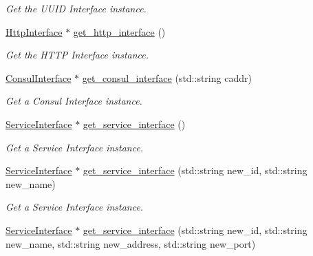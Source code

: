 \begin{DoxyCompactItemize}
\begin{DoxyCompactList}\small\item\em Get the U\-U\-I\-D Interface instance. \end{DoxyCompactList}\item 
\hypertarget{classServiceComponentFactory_a231204b51354b045ea3d5fff7b07ec94}{\hyperlink{classHttpInterface}{Http\-Interface} $\ast$ \hyperlink{classServiceComponentFactory_a231204b51354b045ea3d5fff7b07ec94}{get\-\_\-http\-\_\-interface} ()}\label{classServiceComponentFactory_a231204b51354b045ea3d5fff7b07ec94}

\begin{DoxyCompactList}\small\item\em Get the H\-T\-T\-P Interface instance. \end{DoxyCompactList}\item 
\hypertarget{classServiceComponentFactory_a8f1a67c4158e2e9fc844563b7c35dc15}{\hyperlink{classConsulInterface}{Consul\-Interface} $\ast$ \hyperlink{classServiceComponentFactory_a8f1a67c4158e2e9fc844563b7c35dc15}{get\-\_\-consul\-\_\-interface} (std\-::string caddr)}\label{classServiceComponentFactory_a8f1a67c4158e2e9fc844563b7c35dc15}

\begin{DoxyCompactList}\small\item\em Get a Consul Interface instance. \end{DoxyCompactList}\item 
\hypertarget{classServiceComponentFactory_a18fc7b189a89281312ae594db57bf9f3}{\hyperlink{classServiceInterface}{Service\-Interface} $\ast$ \hyperlink{classServiceComponentFactory_a18fc7b189a89281312ae594db57bf9f3}{get\-\_\-service\-\_\-interface} ()}\label{classServiceComponentFactory_a18fc7b189a89281312ae594db57bf9f3}

\begin{DoxyCompactList}\small\item\em Get a Service Interface instance. \end{DoxyCompactList}\item 
\hypertarget{classServiceComponentFactory_ae0f4ffe321b3ef4f0677a319a29bb7ac}{\hyperlink{classServiceInterface}{Service\-Interface} $\ast$ \hyperlink{classServiceComponentFactory_ae0f4ffe321b3ef4f0677a319a29bb7ac}{get\-\_\-service\-\_\-interface} (std\-::string new\-\_\-id, std\-::string new\-\_\-name)}\label{classServiceComponentFactory_ae0f4ffe321b3ef4f0677a319a29bb7ac}

\begin{DoxyCompactList}\small\item\em Get a Service Interface instance. \end{DoxyCompactList}\item 
\hypertarget{classServiceComponentFactory_a00f71ee92a14c3d850d8dd7e808d4b19}{\hyperlink{classServiceInterface}{Service\-Interface} $\ast$ \hyperlink{classServiceComponentFactory_a00f71ee92a14c3d850d8dd7e808d4b19}{get\-\_\-service\-\_\-interface} (std\-::string new\-\_\-id, std\-::string new\-\_\-name, std\-::string new\-\_\-address, std\-::string new\-\_\-port)}\label{classServiceComponentFactory_a00f71ee92a14c3d850d8dd7e808d4b19}


\end{DoxyCompactItemize}
